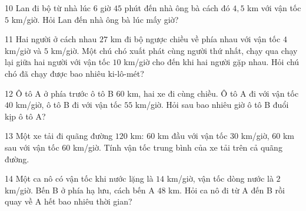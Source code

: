\gap
\begin{probbox}{10}{\relax}
Lan đi bộ từ nhà lúc $6$ giờ $45$ phút đến nhà ông bà cách đó $4{,}5$ km với vận tốc $5$ km/giờ. Hỏi Lan đến nhà ông bà lúc mấy giờ?
\end{probbox}
\gap
\begin{probbox}{11}{}
Hai người ở cách nhau $27$ km đi bộ ngược chiều về phía nhau với vận tốc $4$ km/giờ và $5$ km/giờ. Một chú chó xuất phát cùng người thứ nhất, chạy qua chạy lại giữa hai người với vận tốc $10$ km/giờ cho đến khi hai người gặp nhau. Hỏi chú chó đã chạy được bao nhiêu ki-lô-mét?
\end{probbox}
\gap
\begin{probbox}{12}{\relax}
Ô tô A ở phía trước ô tô B $60$ km, hai xe đi cùng chiều. Ô tô A đi với vận tốc $40$ km/giờ, ô tô B đi với vận tốc $55$ km/giờ. Hỏi sau bao nhiêu giờ ô tô B đuổi kịp ô tô A?
\end{probbox}
\gap
\begin{probbox}{13}{}
Một xe tải đi quãng đường $120$ km: $60$ km đầu với vận tốc $30$ km/giờ, $60$ km sau với vận tốc $60$ km/giờ. Tính vận tốc trung bình của xe tải trên cả quãng đường.
\end{probbox}
\gap
\begin{probbox}{14}{\relax}
Một ca nô có vận tốc khi nước lặng là $14$ km/giờ, vận tốc dòng nước là $2$ km/giờ. Bến B ở phía hạ lưu, cách bến A $48$ km. Hỏi ca nô đi từ A đến B rồi quay về A hết bao nhiêu thời gian?
\end{probbox}
